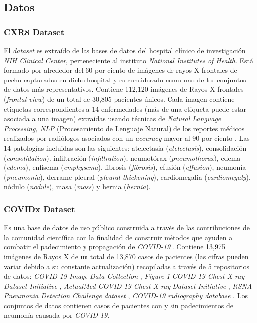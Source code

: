 \subsection{Datos}

\subsubsection{CXR8 Dataset}

El \textit{dataset} es extraído de las bases de datos del hospital clínico de investigación \textit{NIH
Clinical Center}, perteneciente al instituto \textit{National Institutes of Health}. Está formado por
alrededor del 60 por ciento de imágenes de rayos X frontales de pecho capturadas en dicho hospital y
es considerado como uno de los conjuntos de datos más representativos. Contiene
112,120 imágenes de Rayos X frontales (\textit{frontal-view}) de un total de 30,805 pacientes únicos. Cada
imagen contiene etiquetas correspondientes a 14 enfermedades (más de una etiqueta puede estar
asociada a una imagen) extraídas usando técnicas de \textit{Natural Language Processing, NLP}
(Procesamiento de Lenguaje Natural) de los reportes médicos realizados por radiólogos asociados
con un \textit{accuracy} mayor al 90 por ciento \cite{8099852}. Las 14 patologías incluidas son las
siguientes: atelectasia (\textit{atelectasis}), consolidación (\textit{consolidation}), infiltración (\textit{infiltration}),
neumotórax (\textit{pneumothorax}), edema (\textit{edema}), enfisema (\textit{emphysema}), fibrosis (\textit{fibrosis}),
efusión (\textit{effusion}), neumonía (\textit{pneumonia}), derrame pleural (\textit{pleural-thickening}), cardiomegalia (\textit{cardiomegaly}),
nódulo (\textit{nodule}), masa (\textit{mass}) y hernia (\textit{hernia}).


\subsubsection{COVIDx Dataset}

Es una base de datos de uso público construida a través de las contribuciones de la comunidad
científica con la finalidad de construir métodos que ayuden a combatir el padecimiento y propagación
de \textit{COVID-19} \cite{Wang2020}. Contiene 13,975 imágenes de Rayos X de un total de 13,870 casos de
pacientes (las cifras pueden variar debido a su constante actualización) recopiladas a través de 5
repositorios de datos: \textit{COVID-19 Image Data Collection} \cite{cohen2020covid19},
\textit{Figure 1 COVID-19 Chest X-ray Dataset Initiative} \cite{figure1_2020covid19},
\textit{ActualMed COVID-19 Chest X-ray Dataset Initiative} \cite{actualmed_2020covid19},
\textit{RSNA Pneumonia Detection Challenge dataset} \cite{rsna_det_challlenge},
\textit{COVID-19 radiography database} \cite{rsna_det_challenge2}. Los conjuntos de datos
contienen casos de pacientes con y sin padecimientos de neumonía causada por \textit{COVID-19}.


